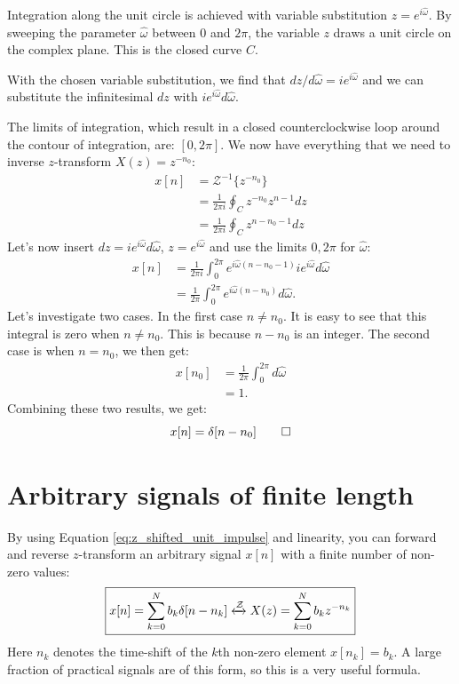 Integration along the unit circle is achieved with variable
substitution $z=e^{i\hat{\omega}}$. By sweeping the parameter
$\hat{\omega}$ between 0 and $2\pi$, the variable $z$ draws a unit
circle on the complex plane. This is the closed curve $C$.

With the chosen variable substitution, we find that $dz/d\hat{\omega}
  = i e^{i\hat{\omega}}$ and we can substitute the infinitesimal $dz$ with
$i e^{i\hat{\omega}} d\hat{\omega}$.

The limits of integration, which result in a closed counterclockwise
loop around the contour of integration, are: $[0,2\pi]$. We now have
everything that we need to inverse $z$-transform $X(z)=z^{-n_0}$:
\begin{align}
  x[n] & = \mathcal{Z}^{-1}\{ z^{-n_0} \}              \\
       & = \frac{1}{2\pi i}\oint_C z^{-n_0} z^{n-1} dz \\
       & = \frac{1}{2\pi i}\oint_C z^{n-n_0-1}  dz
\end{align}
Let's now insert $dz=ie^{i\hat{\omega}}d\hat{\omega}$, $z=e^{i\hat{\omega}}$ and use the limits $0,2\pi$ for $\hat{\omega}$:
\begin{align}
  x[n] & = \frac{1}{2\pi i} \int_0^{2\pi} e^{i\hat{\omega} (n-n_0-1)} i e^{i\hat{\omega}} d\hat{\omega} \\
       & = \frac{1}{2\pi } \int_0^{2\pi} e^{i\hat{\omega} (n-n_0)}   d\hat{\omega}.
\end{align}
Let's investigate two cases. In the first case $n \ne n_0$. It is easy to see that this integral is zero when $n \ne n_0$. This is
because $n-n_0$ is an integer. The second case is when $n=n_0$, we then get:
\begin{align}
  x[n_0] & = \frac{1}{2\pi}\int_{0}^{2\pi} d\hat{\omega} \\
         & = 1.
\end{align}
Combining these two results, we get:
\begin{equation}
  x[n] = \delta[n-n_0]\qed
\end{equation}

\section{Arbitrary signals of finite length}

By using Equation \ref{eq:z_shifted_unit_impulse} and linearity, you
can forward and reverse $z$-transform an arbitrary signal $x[n]$ with a
finite number of non-zero values:
\begin{equation}
  \boxed{
    x[n] = \sum_{k=0}^{N}  b_k \delta[n-n_k] \xleftrightarrow{\mathcal{Z}} X(z) = \sum_{k=0}^{N}  b_k z^{-n_k}
    \label{eq:fir_z_transform}
  }
\end{equation}
Here $n_k$ denotes the time-shift of the $k$th non-zero element
$x[n_k]=b_k$. A large fraction of practical signals are of this form, so this is a very useful formula.


